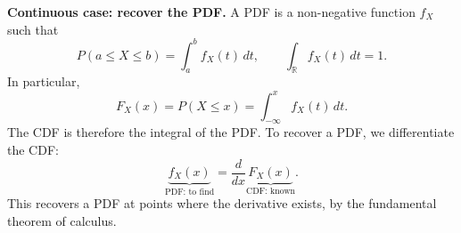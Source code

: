 \documentclass[12pt,a4paper,oneside]{report}
\begin{document}
\textbf{Continuous case: recover the PDF.}
A PDF is a non-negative function $f_X$ such that
\[
  P(a\leq X\leq b)=\int_a^b f_X(t)\,dt,
  \qquad \int_{\mathbb R}f_X(t)\,dt=1.
\]
In particular,
\[
  F_X(x)=P(X\leq x)=\int_{-\infty}^{x}f_X(t)\,dt.
\]
The CDF is therefore the integral of the PDF. To recover a PDF,
we differentiate the CDF:
\[
  \boxed{\underbrace{f_X(x)}_{\text{PDF: to find}}
    =\frac{d}{dx}\underbrace{F_X(x)}_{\text{CDF: known}}.}
\]
This recovers a PDF at points where the derivative exists, by the
fundamental theorem of calculus.
\end{document}
